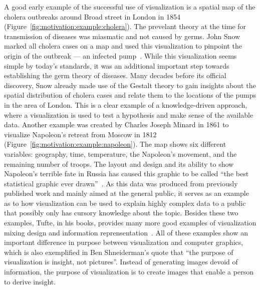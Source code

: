 A good early example of the successful use of visualization is a spatial map of the cholera outbreaks around Broad street in London in 1854 (Figure~\ref{fig:motivation:example:cholera}).  The prevelant theory at the time for transmission of diseases was miasmatic and not caused by germs.  John Snow marked all cholera cases on a map and used this visualization to pinpoint the origin of the outbreak --- an infected pump~\cite{snow1855mode}.  While this visualization seems simple by today's standards, it was an additional important step towards establishing the germ theory of diseases.  Many decades before its official discovery, Snow already made use of the Gestalt theory to gain insights about the spatial distribution of cholera cases and relate them to the locations of the pumps in the area of London.  This is a clear example of a knowledge-driven approach, where a visualization is used to test a hypothesis and make sense of the available data.  Another example was created by Charles Joseph Minard in 1861 to visualize Napoleon's retreat from Moscow in 1812 (Figure~\ref{fig:motivation:example:napoleon}).  The map shows six different variables: geography, time, temperature, the Napoleon’s movement, and the remaining number of troops.  The layout and design and its ability to show Napoleon's terrible fate in Russia has caused this graphic to be called ``the best statistical graphic ever drawn''~\cite{tufte1983visual}.  As this data was produced from previously published work and mainly aimed at the general public, it serves as an example as to how visualization can be used to explain highly complex data to a public that possibly only has cursory knowledge about the topic.  Besides these two examples, Tufte, in his books, provides many more good examples of visualization mixing design and information reprensentation~\cite{tufte1991envisioning}.  All of these examples show an important difference in purpose between visualization and computer graphics, which is also exemplified in Ben Shneiderman's quote that ``the purpose of visualization is insight, not pictures''.  Instead of generating images devoid of information, the purpose of visualization is to create images that enable a person to derive insight.

